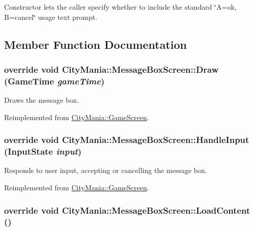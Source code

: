 Constructor lets the caller specify whether to include the standard \char`\"{}A=ok, B=cancel\char`\"{} usage text prompt. 

\subsection{Member Function Documentation}
\hypertarget{classCityMania_1_1MessageBoxScreen_a180792261ea11fe8d33271cc3e7d3c1d}{
\subsubsection[{Draw}]{\setlength{\rightskip}{0pt plus 5cm}override void CityMania::MessageBoxScreen::Draw (GameTime {\em gameTime})}}
\label{classCityMania_1_1MessageBoxScreen_a180792261ea11fe8d33271cc3e7d3c1d}


Draws the message box. 

Reimplemented from \hyperlink{classCityMania_1_1GameScreen_a28fbcdba21da5e606d32d87b18bcdf29}{CityMania::GameScreen}.\hypertarget{classCityMania_1_1MessageBoxScreen_ac6d8b1716a1976f8769276ab078fed90}{
\subsubsection[{HandleInput}]{\setlength{\rightskip}{0pt plus 5cm}override void CityMania::MessageBoxScreen::HandleInput ({\bf InputState} {\em input})}}
\label{classCityMania_1_1MessageBoxScreen_ac6d8b1716a1976f8769276ab078fed90}


Responds to user input, accepting or cancelling the message box. 

Reimplemented from \hyperlink{classCityMania_1_1GameScreen_a80edab75e121f4e08b007f47206cf29c}{CityMania::GameScreen}.\hypertarget{classCityMania_1_1MessageBoxScreen_a0aa4e3fd4153ea36c090fbf7d2f428fe}{
\subsubsection[{LoadContent}]{\setlength{\rightskip}{0pt plus 5cm}override void CityMania::MessageBoxScreen::LoadContent ()}}
\label{classCityMania_1_1MessageBoxScreen_a0aa4e3fd4153ea36c090fbf7d2f428fe}


